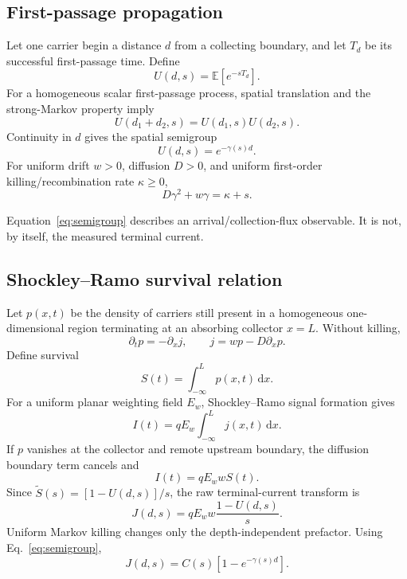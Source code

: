 \documentclass[11pt]{article}
\newcommand{\E}{\mathbb{E}}
\newcommand{\dd}{\mathrm{d}}
\begin{document}
\subsection{First-passage propagation}

Let one carrier begin a distance $d$ from a collecting boundary, and let $T_d$ be its successful first-passage time. Define
\begin{equation}
U(d,s)=\E[e^{-sT_d}].
\label{eq:Udef}
\end{equation}
For a homogeneous scalar first-passage process, spatial translation and the strong-Markov property imply
\begin{equation}
U(d_1+d_2,s)=U(d_1,s)U(d_2,s).
\end{equation}
Continuity in $d$ gives the spatial semigroup
\begin{equation}
\boxed{U(d,s)=e^{-\gamma(s)d}.}
\label{eq:semigroup}
\end{equation}
For uniform drift $w>0$, diffusion $D>0$, and uniform first-order killing/recombination rate $\kappa\ge 0$,
\begin{equation}
\boxed{D\gamma^2+w\gamma=\kappa+s.}
\label{eq:dispersion}
\end{equation}

Equation~\eqref{eq:semigroup} describes an arrival/collection-flux observable. It is not, by itself, the measured terminal current.

\subsection{Shockley--Ramo survival relation}

Let $p(x,t)$ be the density of carriers still present in a homogeneous one-dimensional region terminating at an absorbing collector $x=L$. Without killing,
\begin{equation}
\partial_t p=-\partial_x j,
\qquad
j=wp-D\partial_xp.
\label{eq:continuity}
\end{equation}
Define survival
\begin{equation}
S(t)=\int_{-\infty}^{L}p(x,t)\,\dd x.
\end{equation}
For a uniform planar weighting field $E_w$, Shockley--Ramo signal formation \cite{Shockley1938,Ramo1939,Dabrowski1989} gives
\begin{equation}
I(t)=qE_w\int_{-\infty}^{L}j(x,t)\,\dd x.
\end{equation}
If $p$ vanishes at the collector and remote upstream boundary, the diffusion boundary term cancels and
\begin{equation}
\boxed{I(t)=qE_w w S(t).}
\label{eq:ramo_survival}
\end{equation}
Since $\widetilde S(s)=[1-U(d,s)]/s$, the raw terminal-current transform is
\begin{equation}
J(d,s)=qE_w w\frac{1-U(d,s)}{s}.
\label{eq:Jnokill}
\end{equation}
Uniform Markov killing changes only the depth-independent prefactor. Using Eq.~\eqref{eq:semigroup},
\begin{equation}
\boxed{J(d,s)=C(s)\left[1-e^{-\gamma(s)d}\right].}
\label{eq:Jaffine}
\end{equation}
\end{document}
